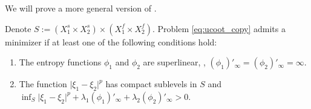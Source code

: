 We will prove a more general version of .
\begin{proposition}
    \label{eq:ucoot_existence_copy}
  Denote $S := (X_1^s \times X_2^s) \times (X_1^f \times X_2^f)$.
  Problem \eqref{eq:ucoot_copy} admits a minimizer if at least one of
  the following conditions hold:
  \begin{enumerate}
    \item The entropy functions $\phi_1$ and $\phi_2$ are superlinear, \ie,
    $(\phi_1)'_{\infty} = (\phi_2)'_{\infty} = \infty$.
    \item The function $\vert \xi_1 - \xi_2 \vert^p$ has compact sublevels in $S$ and
    $\inf_{S} \vert \xi_1 - \xi_2 \vert^p + \lambda_1 (\phi_1)'_{\infty} + \lambda_2 (\phi_2)'_{\infty} > 0$.
  \end{enumerate}
\end{proposition}
